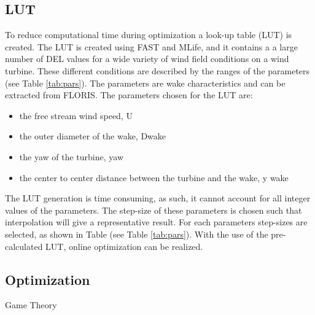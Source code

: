 \subsection{LUT}
 To reduce computational time during optimization a look-up table (LUT) is created. The LUT is created using FAST and MLife, and it contains a a large number of DEL values for a wide variety of wind field conditions on a wind turbine.
These different conditions are described by the ranges of the parameters (see Table \ref{tab:pars}). The parameters are wake characteristics and can be extracted from FLORIS. The parameters chosen for the LUT are:\begin{itemize}
	\item the free stream wind speed, U
	\item the outer diameter of the wake, Dwake
	\item the yaw of the turbine, yaw  
	\item the center to center distance between the turbine and the wake, y wake 
\end{itemize}   
 The LUT generation is time consuming, as such, it cannot account for all integer values of the parameters. The step-size of these parameters is chosen such that interpolation will give a representative result. For each parameters step-sizes are selected, as shown in Table (see Table \ref{tab:pars}). With the use of the pre-calculated LUT, online optimization can be realized.

\subsection{Optimization}
Game Theory


